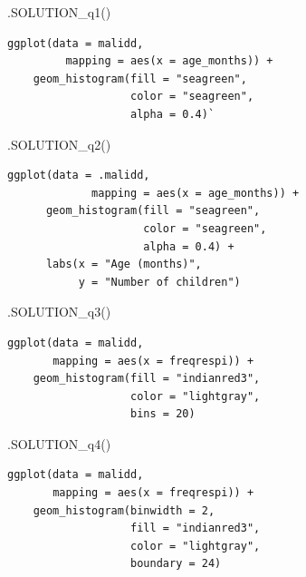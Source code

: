 \documentclass[
  letterpaper,
  DIV=11,
  numbers=noendperiod]{scrreprt}
\newenvironment{Shaded}{\begin{snugshade}}{\end{snugshade}}
\newcommand{\FunctionTok}[1]{\textcolor[rgb]{0.28,0.35,0.67}{#1}}
\newcommand{\NormalTok}[1]{\textcolor[rgb]{0.00,0.23,0.31}{#1}}
\begin{document}
\begin{Shaded}
\begin{Highlighting}[]
\FunctionTok{.SOLUTION\_q1}\NormalTok{()}
\end{Highlighting}
\end{Shaded}

\begin{verbatim}
ggplot(data = malidd, 
         mapping = aes(x = age_months)) +
    geom_histogram(fill = "seagreen",
                   color = "seagreen",
                   alpha = 0.4)`
\end{verbatim}

\begin{Shaded}
\begin{Highlighting}[]
\FunctionTok{.SOLUTION\_q2}\NormalTok{()}
\end{Highlighting}
\end{Shaded}

\begin{verbatim}
ggplot(data = .malidd, 
             mapping = aes(x = age_months)) +
      geom_histogram(fill = "seagreen",
                     color = "seagreen",
                     alpha = 0.4) +
      labs(x = "Age (months)",
           y = "Number of children")
\end{verbatim}

\begin{Shaded}
\begin{Highlighting}[]
\FunctionTok{.SOLUTION\_q3}\NormalTok{() }
\end{Highlighting}
\end{Shaded}

\begin{verbatim}
ggplot(data = malidd, 
       mapping = aes(x = freqrespi)) +
    geom_histogram(fill = "indianred3",
                   color = "lightgray",
                   bins = 20)
\end{verbatim}

\begin{Shaded}
\begin{Highlighting}[]
\FunctionTok{.SOLUTION\_q4}\NormalTok{()}
\end{Highlighting}
\end{Shaded}

\begin{verbatim}
ggplot(data = malidd, 
       mapping = aes(x = freqrespi)) +
    geom_histogram(binwidth = 2,
                   fill = "indianred3",
                   color = "lightgray",
                   boundary = 24)
\end{verbatim}
\end{document}
